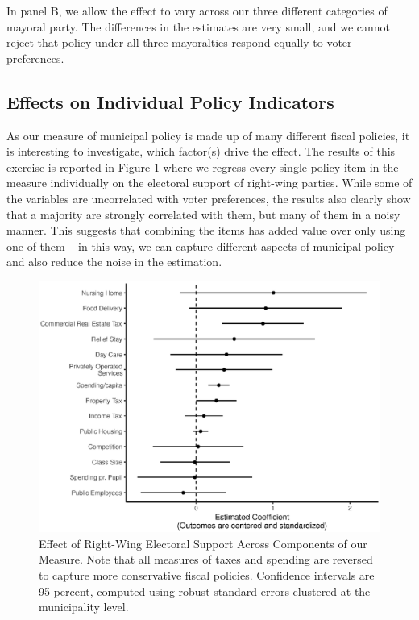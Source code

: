 \documentclass[a4paper,12pt]{article}
\begin{document}
In panel B, we allow the effect to vary across our three different categories of mayoral party. The differences in the estimates are very small, and we cannot reject that policy under all three mayoralties respond equally to voter preferences.

\clearpage

\subsection{Effects on Individual Policy Indicators}


As our measure of municipal policy is made up of many different fiscal policies, it is interesting to investigate, which factor(s) drive the effect. The results of this exercise is reported in Figure \ref{fig:item} where we regress every single policy item in the measure individually on the electoral support of right-wing parties. While some of the variables are uncorrelated with voter preferences, the results also clearly show that a majority are strongly correlated with them, but many of them in a noisy manner. This suggests that combining the items has added value over only using one of them -- in this way, we can capture different aspects of municipal policy and also reduce the noise in the estimation. 

\begin{figure}[!htb]
	\centering
	\includegraphics[scale = 1]{ItemByItem_18092018.eps}
	\caption{Effect of Right-Wing Electoral Support Across Components of our Measure. Note that all measures of taxes and spending are reversed to capture more conservative fiscal policies. Confidence intervals are 95 percent, computed using robust standard errors clustered at the municipality level.} \label{fig:item}
\end{figure}
\clearpage



\end{document}
